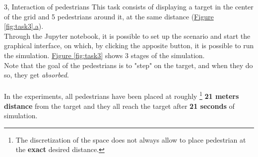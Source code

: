 \documentclass[10pt,a4paper]{article}
\begin{document}
\begin{task}{3, Interaction of pedestrians}
This task consists of displaying a target in the center of the grid and 5 pedestrians around it, at the same distance (\hyperref[fig:task3]{Figure \ref{fig:task3}.a}).\\
Through the Jupyter notebook, it is possible to set up the scenario and start the graphical interface, on which, by clicking the apposite button, it is possible to run the simulation.
\hyperref[fig:task3]{Figure \ref{fig:task3}} shows 3 stages of the simulation.\\
Note that the goal of the pedestrians is to "step" on the target, and when they do so, they get \textit{absorbed}.\\\\
In the experiments, all pedestrians have been placed at roughly
\footnote{The discretization of the space does not always allow to place pedestrian at the \textbf{exact} desired distance.}
\textbf{21 meters distance} from the target and they all reach the target after \textbf{21 seconds} of simulation.\\


\end{task}
\end{document}
